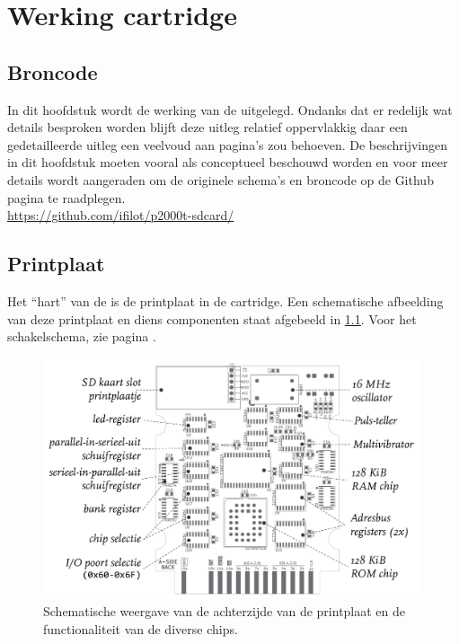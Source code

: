 \chapter{Werking cartridge}
\chapterpreamble

\section{Broncode}

In dit hoofdstuk wordt de werking van de \product uitgelegd. Ondanks dat er redelijk wat details besproken worden blijft deze uitleg relatief oppervlakkig daar een gedetailleerde uitleg een veelvoud aan pagina's zou behoeven. De beschrijvingen in dit hoofdstuk moeten vooral als conceptueel beschouwd worden en voor meer details wordt aangeraden om de originele schema's en broncode op de Github pagina te raadplegen.\\
\url{https://github.com/ifilot/p2000t-sdcard/}

%
%
%
\section{Printplaat}

Het ``hart'' van de \product is de printplaat in de  cartridge. Een schematische afbeelding van deze printplaat en diens componenten staat afgebeeld in \cref{fig:pcb-design}. Voor het schakelschema, zie pagina \pageref{sec:schematic-cartridge2}.

\begin{figure}[h!]
    \centering
    \includegraphics[width=0.99\textwidth]{img/pcb-design}
    \caption{Schematische weergave van de achterzijde van de printplaat en de functionaliteit van de diverse chips.}
    \label{fig:pcb-design}
\end{figure}

